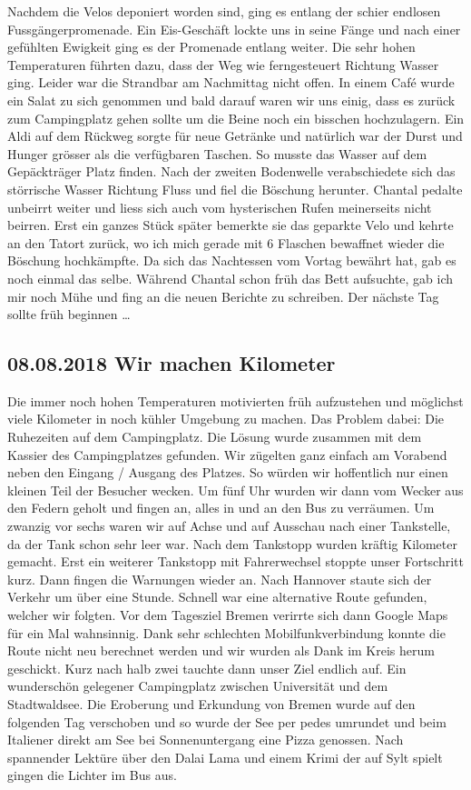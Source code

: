 Nachdem die Velos deponiert worden sind, ging es entlang der schier endlosen Fussgängerpromenade.
Ein Eis-Geschäft lockte uns in seine Fänge und nach einer gefühlten Ewigkeit ging es der Promenade entlang weiter.
Die sehr hohen Temperaturen führten dazu, dass der Weg wie ferngesteuert Richtung Wasser ging. 
Leider war die Strandbar am Nachmittag nicht offen. 
In einem Café wurde ein Salat zu sich genommen und bald darauf waren wir uns einig, dass es zurück zum Campingplatz gehen sollte um die Beine noch ein bisschen hochzulagern.
Ein Aldi auf dem Rückweg sorgte für neue Getränke und natürlich war der Durst und Hunger grösser als die verfügbaren Taschen.
So musste das Wasser auf dem Gepäckträger Platz finden. 
Nach der zweiten Bodenwelle verabschiedete sich das störrische Wasser Richtung Fluss und fiel die Böschung herunter.
Chantal pedalte unbeirrt weiter und liess sich auch vom hysterischen Rufen meinerseits nicht beirren.
Erst ein ganzes Stück später bemerkte sie das geparkte Velo und kehrte an den Tatort zurück, wo ich mich gerade mit 6 Flaschen bewaffnet wieder die Böschung hochkämpfte.
Da sich das Nachtessen vom Vortag bewährt hat, gab es noch einmal das selbe.
Während Chantal schon früh das Bett aufsuchte, gab ich mir noch Mühe und fing an die neuen Berichte zu schreiben.
Der nächste Tag sollte früh beginnen \dots

\subsection{08.08.2018 Wir machen Kilometer}
Die immer noch hohen Temperaturen motivierten früh aufzustehen und möglichst viele Kilometer in noch kühler Umgebung zu machen.
Das Problem dabei: Die Ruhezeiten auf dem Campingplatz.
Die Lösung wurde zusammen mit dem Kassier des Campingplatzes gefunden. Wir zügelten ganz einfach am Vorabend neben den Eingang / Ausgang des Platzes.
So würden wir hoffentlich nur einen kleinen Teil der Besucher wecken.
Um fünf Uhr wurden wir dann vom Wecker aus den Federn geholt und fingen an, alles in und an den Bus zu verräumen.
Um zwanzig vor sechs waren wir auf Achse und auf Ausschau nach einer Tankstelle, da der Tank schon sehr leer war.
Nach dem Tankstopp wurden kräftig Kilometer gemacht.
Erst ein weiterer Tankstopp mit Fahrerwechsel stoppte unser Fortschritt kurz.
Dann fingen die Warnungen wieder an. 
Nach Hannover staute sich der Verkehr um über eine Stunde.
Schnell war eine alternative Route gefunden, welcher wir folgten.
Vor dem Tagesziel Bremen verirrte sich dann Google Maps für ein Mal wahnsinnig. 
Dank sehr schlechten Mobilfunkverbindung konnte die Route nicht neu berechnet werden und wir wurden als Dank im Kreis herum geschickt.
Kurz nach halb zwei tauchte dann unser Ziel endlich auf.
Ein wunderschön gelegener Campingplatz zwischen Universität und dem Stadtwaldsee.
Die Eroberung und Erkundung von Bremen wurde auf den folgenden Tag verschoben und so wurde der See per pedes umrundet und beim Italiener direkt am See bei Sonnenuntergang eine Pizza genossen.
Nach spannender Lektüre über den Dalai Lama und einem Krimi der auf Sylt spielt gingen die Lichter im Bus aus.

